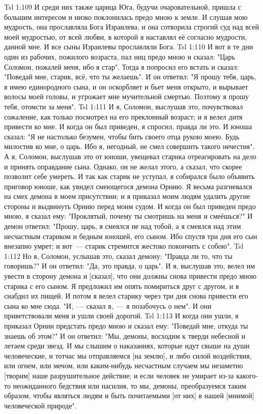 \vs Tsl 1:109 
И среди них также царица Юга, будучи очаровательной, пришла с большим интересом и низко поклонилась предо мною к земле. И слушая мою мудрость, она прославляла Бога Израилева, и она сотворила строгий суд над всей моей мудростью, от всей любви, в которой я наставлял её согласно мудрости, данной мне. И все сыны Израилевы прославляли Бога.
\vs Tsl 1:110 
И вот в те дни один из рабочих, пожилого возраста, пал ниц предо мною и сказал: "Царь Соломон, пожалей меня, ибо я стар". Тогда я попросил его встать и сказал: "Поведай мне, старик, всё, что ты желаешь". И он ответил: "Я прошу тебя, царь, я имею единородного сына, и он оскорбляет и бьет меня открыто, и вырывает волосы моей головы, и угрожает мне мучительной смертью. Поэтому я прошу тебя, отомсти за меня".
\vs Tsl 1:111 
И я, Соломон, выслушав это, почувствовал сожаление, как только посмотрел на его преклонный возраст; и я велел дитя привести ко мне. И когда он был приведен, я спросил, правда ли это. И юноша сказал: "Я не настолько безумен, чтобы бить своего отца рукою моею. Будь милостив ко мне, о царь. Ибо я, негодный, не смел совершить такого нечестия". А я, Соломон, выслушав это от юноши, увещевал старика отреагировать на дело и принять оправдание сына. Однако, он не желал этого, а сказал, что скорее позволит себе умереть. И так как старик не уступал, я собирался было объявить приговор юноше, как увидел смеющегося демона Орнию. Я весьма разгневался на смех демона в моем присутствии; и я приказал моим людям удалить другие стороны и выдвинуть Орнию перед моим судом. И когда он был приведен предо мною, я сказал ему: "Проклятый, почему ты смотришь на меня и смеёшься?" И демон ответил: "Прошу, царь, я смеялся не над тобой, а я смеялся над этим несчастным стариком и бедным юношей, его сыном. Ибо спустя три дня его сын внезапно умрет; и вот~--- старик стремится жестоко покончить с собою".
\vs Tsl 1:112 
Но я, Соломон, услышав это, сказал демону: "Правда ли то, что ты говоришь?" И он ответил: "Да, это правда, о царь". И я, выслушав это, велел им увести в сторону демона и [сказал], что они должны снова привести предо мною старика с его сыном. Я предложил им опять помириться друг с другом, и я снабдил их пищей. И потом я велел старику через три дня снова привести его сына ко мне сюда. "И,~--- сказал я,~--- я позабочусь о нем". И они приветствовали меня и ушли своей дорогой.
\vs Tsl 1:113 
И когда они ушли, я приказал Орнии предстать предо мною и сказал ему: "Поведай мне, откуда ты знаешь об этом?" И он ответил: "Мы, демоны, восходим к тверди небесной и летаем среди звезд. И мы слышим о наказаниях, которые идут свыше на души человеческие, и тотчас мы отправляемся [на землю], и либо силой воздействия, или огнем, или мечом, или каким-нибудь несчастным случаем мы незаметно [творим] наше разрушительное действие; и если человек не умирает из-за какого-то неожиданного бедствия или насилия, то мы, демоны, преобразуемся таким образом, чтобы являться людям и быть почитаемыми [от них] в нашей [мнимой] человеческой природе".
